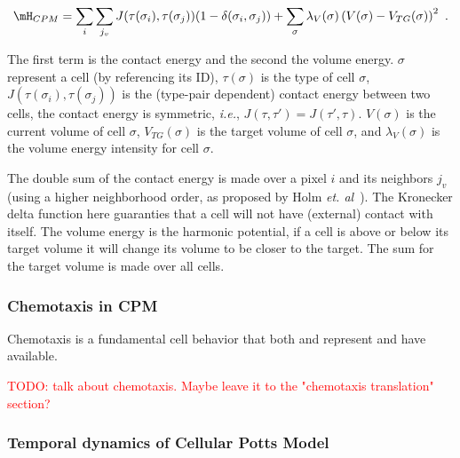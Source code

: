 \begin{equation}\label{eq:abm:cpm-hamiltonian}
\mH_{CPM} = \sum_i \sum_{j_v} J(\tau(\sigma_i),\tau(\sigma_j))(1 - \delta(\sigma_i,\sigma_j)) + \sum_{\sigma}\lambda_V(\sigma)\left(V(\sigma) - V_{TG}(\sigma)\right)^2\,\,.
\end{equation}

\noindent The first term is the contact energy and the second the volume energy. $\sigma$ represent a cell (by referencing its ID), $\tau(\sigma)$ is the type of cell $\sigma$, $J(\tau(\sigma_i),\tau(\sigma_j))$ is the (type-pair dependent) contact energy between two cells, the contact energy is symmetric, \textit{i.e.}, $J(\tau,\tau') = J(\tau',\tau)$. $V(\sigma)$ is the current volume of cell $\sigma$, $V_{TG}(\sigma)$ is the target volume of cell $\sigma$, and $\lambda_V(\sigma)$ is the volume energy intensity for cell $\sigma$. 

The double sum of the contact energy is made over a pixel $i$ and its neighbors $j_v$ (using a higher neighborhood order, as proposed by Holm \textit{et. al}~\cite{holm1991effects}). The Kronecker delta function here guaranties that a cell will not have (external) contact with itself. The volume energy is the harmonic potential, if a cell is above or below its target volume it will change its volume to be closer to the target. The sum for the target volume is made over all cells. 

\subsubsection{Chemotaxis in CPM}\label{sec:abm:apm-history:chemotaxis-cpm}


Chemotaxis is a fundamental cell behavior that both \ccds and \pscs represent and have available. 

\textcolor{red}{TODO: talk about chemotaxis. Maybe leave it to the "chemotaxis translation" section?}


\subsubsection{Temporal dynamics of Cellular Potts Model}\label{sec:abm:apm-history:cpm-dyn}

